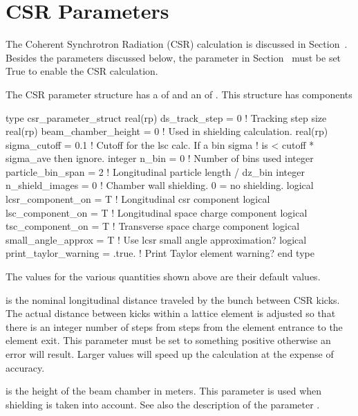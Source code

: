 {{{{{{{{{%
\section{CSR Parameters}
\label{s:csr.params}

The Coherent Synchrotron Radiation (CSR) calculation is discussed in
Section~. Besides the parameters discussed below, the
 parameter in Section~
must be set True to enable the CSR calculation.

The CSR parameter structure has a 
of  and an  of .
This structure has components
\begin{example}
  type csr_parameter_struct 
    real(rp) ds_track_step = 0        ! Tracking step size
    real(rp) beam_chamber_height = 0  ! Used in shielding calculation.
    real(rp) sigma_cutoff = 0.1       ! Cutoff for the lsc calc. If a bin sigma
                                      !  is < cutoff * sigma_ave then ignore.
    integer n_bin = 0                 ! Number of bins used
    integer particle_bin_span = 2     ! Longitudinal particle length / dz_bin
    integer n_shield_images = 0       ! Chamber wall shielding. 0 = no shielding.
    logical lcsr_component_on = T     ! Longitudinal csr component
    logical lsc_component_on = T      ! Longitudinal space charge component
    logical tsc_component_on = T      ! Transverse space charge component
    logical small_angle_approx = T    ! Use lcsr small angle approximation?
    logical print_taylor_warning = .true. ! Print Taylor element warning?
  end type
\end{example}
The values for the various quantities shown above are their default values. 

 is the nominal longitudinal distance traveled by
the bunch between CSR kicks. The actual distance between kicks within
a lattice element is adjusted so that there is an integer number of
steps from steps from the element entrance to the element exit.  This
parameter must be set to something positive otherwise an error will
result. Larger values will speed up the calculation at the expense of
accuracy.

 is the height of the beam chamber in
meters. This parameter is used when shielding is taken into account.
See also the description of the parameter .

}}}}}}}}}
